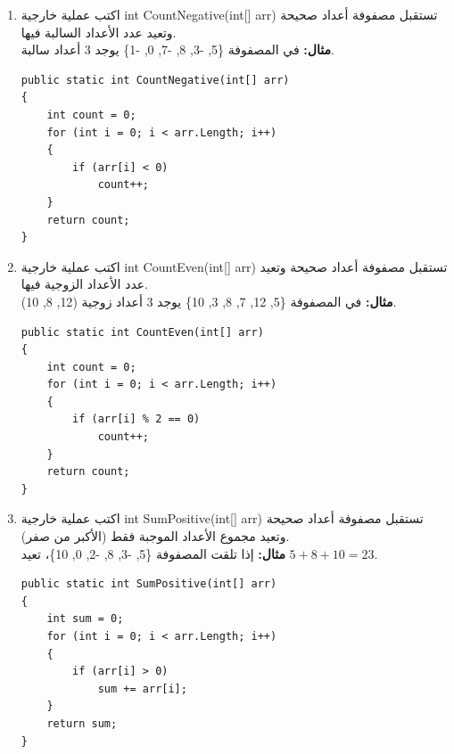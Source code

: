 \documentclass[14pt]{extarticle}
\begin{document}
\begin{enumerate}[resume, itemsep=2em]
    \item
    اكتب عملية خارجية \textenglish{int CountNegative(int[] arr)} تستقبل مصفوفة أعداد صحيحة وتعيد عدد الأعداد السالبة فيها.\\
    \textbf{مثال:} في المصفوفة \textenglish{\{5, -3, 8, -7, 0, -1\}} يوجد 3 أعداد سالبة.
    \ifwithsols
    \begin{boxSolution}
    \begin{english}
    \begin{verbatim}
public static int CountNegative(int[] arr)
{
    int count = 0;
    for (int i = 0; i < arr.Length; i++)
    {
        if (arr[i] < 0)
            count++;
    }
    return count;
}
    \end{verbatim}
    \end{english}
    \end{boxSolution}
    \fi

    \item
    اكتب عملية خارجية \textenglish{int CountEven(int[] arr)} تستقبل مصفوفة أعداد صحيحة وتعيد عدد الأعداد الزوجية فيها.\\
    \textbf{مثال:} في المصفوفة \textenglish{\{5, 12, 7, 8, 3, 10\}} يوجد 3 أعداد زوجية (12, 8, 10).
    \ifwithsols
    \begin{boxSolution}
    \begin{english}
    \begin{verbatim}
public static int CountEven(int[] arr)
{
    int count = 0;
    for (int i = 0; i < arr.Length; i++)
    {
        if (arr[i] % 2 == 0)
            count++;
    }
    return count;
}
    \end{verbatim}
    \end{english}
    \end{boxSolution}
    \fi

    \item
    اكتب عملية خارجية \textenglish{int SumPositive(int[] arr)} تستقبل مصفوفة أعداد صحيحة وتعيد مجموع الأعداد الموجبة فقط (الأكبر من صفر).\\
    \textbf{مثال:} إذا تلقت المصفوفة \textenglish{\{5, -3, 8, -2, 0, 10\}}، تعيد $5 + 8 + 10 = 23$.
    \ifwithsols
    \begin{boxSolution}
    \begin{english}
    \begin{verbatim}
public static int SumPositive(int[] arr)
{
    int sum = 0;
    for (int i = 0; i < arr.Length; i++)
    {
        if (arr[i] > 0)
            sum += arr[i];
    }
    return sum;
}
    \end{verbatim}
    \end{english}
    \end{boxSolution}
    \fi


\end{enumerate}
\end{document}
